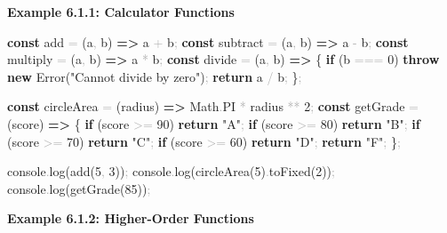 \documentclass[
  justified,
  openright,
]{tufte-book}
\newcommand{\KeywordTok}[1]{\textcolor{CodeKeyword}{\textbf{#1}}}  %
\newcommand{\StringTok}[1]{\textcolor{CodeString}{#1}}              %
\newcommand{\CodeNumTok}[1]{\textcolor{CodeNumber}{#1}}             %
\newcommand{\CodeFuncTok}[1]{\textcolor{CodeKeyword}{#1}}           %
\newcommand{\OperatorTok}[1]{\textcolor{DarkGray}{#1}}              %
\newenvironment{Shaded}{%
  \begin{mdframed}[style=TufteCode]%
}{%
  \end{mdframed}%
}
\begin{document}
\textbf{Example 6.1.1: Calculator Functions}

\begin{Shaded}
\begin{Highlighting}[]
\KeywordTok{const} add \OperatorTok{=} (a\OperatorTok{,} b) \KeywordTok{=\textgreater{}} a \OperatorTok{+} b\OperatorTok{;}
\KeywordTok{const} subtract \OperatorTok{=} (a\OperatorTok{,} b) \KeywordTok{=\textgreater{}} a \OperatorTok{{-}} b\OperatorTok{;}
\KeywordTok{const} multiply \OperatorTok{=} (a\OperatorTok{,} b) \KeywordTok{=\textgreater{}} a \OperatorTok{*} b\OperatorTok{;}
\KeywordTok{const} divide \OperatorTok{=} (a\OperatorTok{,} b) \KeywordTok{=\textgreater{}} \{
  \KeywordTok{if} (b \OperatorTok{===} \CodeNumTok{0}) \KeywordTok{throw} \KeywordTok{new} Error(\StringTok{"Cannot divide by zero"})\OperatorTok{;}
  \KeywordTok{return} a \OperatorTok{/} b\OperatorTok{;}
\}\OperatorTok{;}
 
\KeywordTok{const} circleArea \OperatorTok{=} (radius) \KeywordTok{=\textgreater{}} Math\OperatorTok{.}\CodeNumTok{PI} \OperatorTok{*} radius \OperatorTok{**} \CodeNumTok{2}\OperatorTok{;}
\KeywordTok{const} getGrade \OperatorTok{=} (score) \KeywordTok{=\textgreater{}} \{
  \KeywordTok{if} (score \OperatorTok{\textgreater{}=} \CodeNumTok{90}) \KeywordTok{return} \StringTok{"A"}\OperatorTok{;}
  \KeywordTok{if} (score \OperatorTok{\textgreater{}=} \CodeNumTok{80}) \KeywordTok{return} \StringTok{"B"}\OperatorTok{;}
  \KeywordTok{if} (score \OperatorTok{\textgreater{}=} \CodeNumTok{70}) \KeywordTok{return} \StringTok{"C"}\OperatorTok{;}
  \KeywordTok{if} (score \OperatorTok{\textgreater{}=} \CodeNumTok{60}) \KeywordTok{return} \StringTok{"D"}\OperatorTok{;}
  \KeywordTok{return} \StringTok{"F"}\OperatorTok{;}
\}\OperatorTok{;}
 
console\OperatorTok{.}\CodeFuncTok{log}(\CodeFuncTok{add}(\CodeNumTok{5}\OperatorTok{,} \CodeNumTok{3}))\OperatorTok{;}
console\OperatorTok{.}\CodeFuncTok{log}(\CodeFuncTok{circleArea}(\CodeNumTok{5})\OperatorTok{.}\CodeFuncTok{toFixed}(\CodeNumTok{2}))\OperatorTok{;}
console\OperatorTok{.}\CodeFuncTok{log}(\CodeFuncTok{getGrade}(\CodeNumTok{85}))\OperatorTok{;}
\end{Highlighting}
\end{Shaded}

\textbf{Example 6.1.2: Higher-Order Functions}
\end{document}
